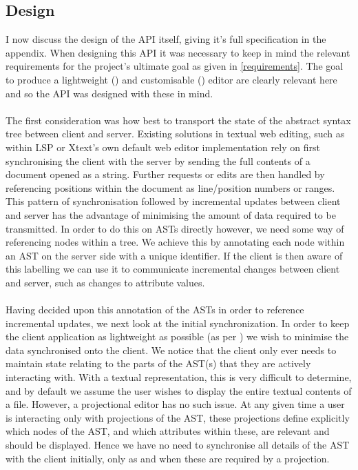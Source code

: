 \documentclass{article}
\begin{document}
\subsection{Design}\label{apiDesign}
I now discuss the design of the API itself, giving it's full specification in the appendix. When designing this API it was necessary to keep in mind the relevant requirements for the project's ultimate goal as given in \ref{requirements}. The goal to produce a lightweight (\RLightweight) and customisable (\RCustom) editor are clearly relevant here and so the API was designed with these in mind.
\\
\\
The first consideration was how best to transport the state of the abstract syntax tree between client and server. Existing solutions in textual web editing, such as within LSP or Xtext's own default web editor implementation rely on first synchronising the client with the server by sending the full contents of a document opened as a string. Further requests or edits are then handled by referencing positions within the document as line/position numbers or ranges. This pattern of synchronisation followed by incremental updates between client and server has the advantage of minimising the amount of data required to be transmitted. In order to do this on ASTs directly however, we need some way of referencing nodes within a tree. We achieve this by annotating each node within an AST on the server side with a unique identifier. If the client is then aware of this labelling we can use it to communicate incremental changes between client and server, such as changes to attribute values.
\\
\\
Having decided upon this annotation of the ASTs in order to reference incremental updates, we next look at the initial synchronization. In order to keep the client application as lightweight as possible (as per \RLightweight) we wish to minimise the data synchronised onto the client. We notice that the client only ever needs to maintain state relating to the parts of the AST(s) that they are actively interacting with. With a textual representation, this is very difficult to determine, and by default we assume the user wishes to display the entire textual contents of a file. However, a projectional editor has no such issue. At any given time a user is interacting only with projections of the AST, these projections define explicitly which nodes of the AST, and which attributes within these, are relevant and should be displayed. Hence we have no need to synchronise all details of the AST with the client initially, only as and when these are required by a projection.
\end{document}
